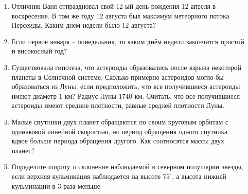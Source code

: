 \documentclass[11pt]{article}
\begin{document}
\begin{enumerate}[label=\textbf{B\arabic*.}]
	\item Отличник Ваня отпраздновал свой $12$-ый день рождения $12$ апреля в воскресение. В том же году $12$ августа был максимум метеорного потока Персеиды. Каким днем недели было $12$ августа? %
    \item Если первое января -- понедельник, то каким днём недели закончится простой и високосный год? %
    \item Существовала гипотеза, что астероиды образовались после взрыва некоторой планеты в Солнечной системе. Сколько примерно астероидов могло бы образоваться из Луны, если предположить, что все получившиеся астероиды имеют диаметр $1$ км? Радиус Луны $1740$ км. Считать, что все получившиеся астероиды имеют средние плотности, равные средней плотности Луны. %
    \item Малые спутники двух планет обращаются по своим круговым орбитам с одинаковой линейной скоростью, но период обращения одного спутника вдвое больше периода обращения другого. Как соотносятся массы двух планет? %
    \item Определите широту и склонение наблюдаемой в северном полушарии звезды, если верхняя кульминация наблюдается на высоте $75^{\circ}$, а высота нижней кульминации в $3$ раза меньше %
\end{enumerate}
\end{document}
